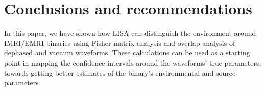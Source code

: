 \documentclass[10pt,a4paper,twoside]{article}
\begin{document}




\section{Conclusions and recommendations}
In this paper, we have shown how LISA can distinguish the environment around IMRI/EMRI binaries using Fisher matrix analysis and overlap analysis of dephased and vacuum waveforms. These calculations can be used as a starting point in mapping the confidence intervals around the waveforms' true parameters, towards getting better estimates of the binary's environmental and source parameters. 

\end{document}
